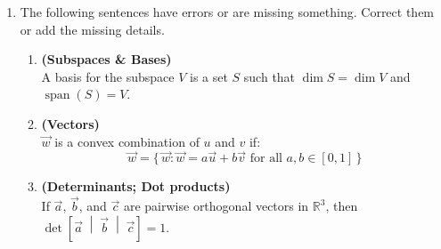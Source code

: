 \documentclass[red]{tutorial}
\newcommand{\R}{\mathbb{R}}
\newcommand{\mute}[1]{}
\DeclareMathOperator{\Span} {span}
\theoremstyle{definition}
\theoremstyle{theorem}
\begin{document}
\begin{tutorial}
  \begin{enumerate}
    \item The following sentences have errors or are missing 
      something. Correct them or add the missing details.
      \begin{enumerate}
          \mute{
        \item \textbf{(Linear Transformations)}\\
          A transformation $f\colon\R^n\to \R^m$ is linear if 
          it sends sums to sums, $f(\vec0) = \vec0$, and 
          $f(\alpha \vec x) = \alpha f(\vec x)$.
        \item 
          An $n\times m$ matrix corresponds to a linear 
          transformation from $\R^n$
          to $\R^m$.}
        \item \textbf{(Subspaces \& Bases)}\\
          A basis for the subspace $V$ is a set $S$ 
          such that $\dim S = \dim V$ and $\Span(S) = V$.
        \item \textbf{(Vectors)}\\
          $\vec w$ is a convex combination of $u$ and $v$ if:
          \begin{equation*}
            \vec w =
            \bigl\{\,\vec w:\vec w = a\vec u %
              +b\vec v \text{ for all } a,b\in [0,1]\,
            \bigr\}
          \end{equation*}
        \item \textbf{(Determinants; Dot products)} \\
          If $\vec a$, $\vec b$, and $\vec c$ are pairwise orthogonal 
          vectors in $\R^3$, then 
          $\det \left[\vec a\;\middle|\;\vec b\;\middle|\;\vec c\right] = 1$.
      \end{enumerate}
      \mute{
    \item %
      Sam has a function $T\colon\R^n\to \R^m$, which has the following
      property:
      \begin{center}
        For any subspace $V\subset \R^n$, we have $T(V)$ is a subspace of $\R^m$.

\end{center}}
\end{enumerate}
\end{tutorial}
\end{document}
